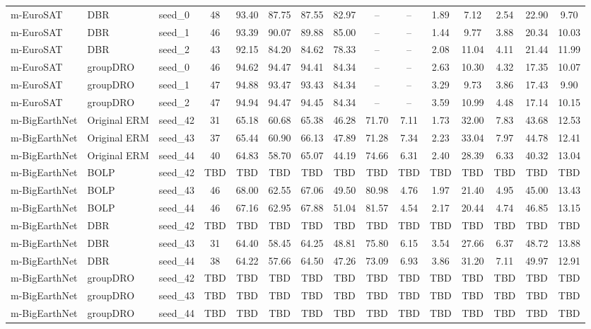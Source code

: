 \documentclass[11pt]{article}
\begin{document}
\begin{table}[h!]
{\begin{tabular}{lllcccccccccccc}
m-EuroSAT & DBR & seed\_0 & 48 & 93.40 & 87.75 & 87.55 & 82.97 & -- & -- & 1.89 & 7.12 & 2.54 & 22.90 & 9.70 \\
m-EuroSAT & DBR & seed\_1 & 46 & 93.39 & 90.07 & 89.88 & 85.00 & -- & -- & 1.44 & 9.77 & 3.88 & 20.34 & 10.03 \\
m-EuroSAT & DBR & seed\_2 & 43 & 92.15 & 84.20 & 84.62 & 78.33 & -- & -- & 2.08 & 11.04 & 4.11 & 21.44 & 11.99 \\
m-EuroSAT & groupDRO & seed\_0 & 46 & 94.62 & 94.47 & 94.41 & 84.34 & -- & -- & 2.63 & 10.30 & 4.32 & 17.35 & 10.07 \\
m-EuroSAT & groupDRO & seed\_1 & 47 & 94.88 & 93.47 & 93.43 & 84.34 & -- & -- & 3.29 & 9.73 & 3.86 & 17.43 & 9.90 \\
m-EuroSAT & groupDRO & seed\_2 & 47 & 94.94 & 94.47 & 94.45 & 84.34 & -- & -- & 3.59 & 10.99 & 4.48 & 17.14 & 10.15 \\

\midrule

m-BigEarthNet & Original ERM & seed\_42 & 31 & 65.18 & 60.68 & 65.38 & 46.28 & 71.70 & 7.11 & 1.73 & 32.00 & 7.83 & 43.68 & 12.53 \\
m-BigEarthNet & Original ERM & seed\_43 & 37 & 65.44 & 60.90 & 66.13 & 47.89 & 71.28 & 7.34 & 2.23 & 33.04 & 7.97 & 44.78 & 12.41 \\
m-BigEarthNet & Original ERM & seed\_44 & 40 & 64.83 & 58.70 & 65.07 & 44.19 & 74.66 & 6.31 & 2.40 & 28.39 & 6.33 & 40.32 & 13.04 \\
m-BigEarthNet & BOLP & seed\_42 & TBD & TBD & TBD & TBD & TBD & TBD & TBD & TBD & TBD & TBD & TBD & TBD \\
m-BigEarthNet & BOLP & seed\_43 & 46 & 68.00 & 62.55 & 67.06 & 49.50 & 80.98 & 4.76 & 1.97 & 21.40 & 4.95 & 45.00 & 13.43 \\
m-BigEarthNet & BOLP & seed\_44 & 46 & 67.16 & 62.95 & 67.88 & 51.04 & 81.57 & 4.54 & 2.17 & 20.44 & 4.74 & 46.85 & 13.15 \\
m-BigEarthNet & DBR & seed\_42 & TBD & TBD & TBD & TBD & TBD & TBD & TBD & TBD & TBD & TBD & TBD & TBD \\
m-BigEarthNet & DBR & seed\_43 & 31 & 64.40 & 58.45 & 64.25 & 48.81 & 75.80 & 6.15 & 3.54 & 27.66 & 6.37 & 48.72 & 13.88 \\
m-BigEarthNet & DBR & seed\_44 & 38 & 64.22 & 57.66 & 64.50 & 47.26 & 73.09 & 6.93 & 3.86 & 31.20 & 7.11 & 49.97 & 12.91 \\
m-BigEarthNet & groupDRO & seed\_42 & TBD & TBD & TBD & TBD & TBD & TBD & TBD & TBD & TBD & TBD & TBD & TBD \\
m-BigEarthNet & groupDRO & seed\_43 & TBD & TBD & TBD & TBD & TBD & TBD & TBD & TBD & TBD & TBD & TBD & TBD \\
m-BigEarthNet & groupDRO & seed\_44 & TBD & TBD & TBD & TBD & TBD & TBD & TBD & TBD & TBD & TBD & TBD & TBD \\


\end{tabular}}
\end{table}
\end{document}
